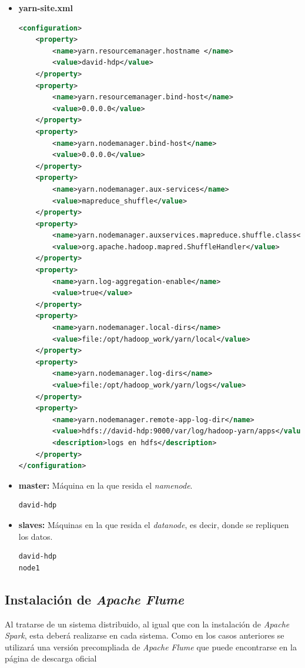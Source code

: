 \begin{itemize}
\item \textbf{ yarn-site.xml}
\begin{lstlisting}[label=yarnsite,language=XML,frame=single,caption=Contenido del ``yarn-site.xml''.]
<configuration>
	<property>
		<name>yarn.resourcemanager.hostname </name>
		<value>david-hdp</value>
	</property>
	<property>
		<name>yarn.resourcemanager.bind-host</name>
		<value>0.0.0.0</value>
	</property>
	<property>
		<name>yarn.nodemanager.bind-host</name>
		<value>0.0.0.0</value>
	</property>
	<property>
		<name>yarn.nodemanager.aux-services</name>
		<value>mapreduce_shuffle</value>
	</property>
	<property>
		<name>yarn.nodemanager.auxservices.mapreduce.shuffle.class</name>
		<value>org.apache.hadoop.mapred.ShuffleHandler</value>
	</property>
	<property>
		<name>yarn.log-aggregation-enable</name>
		<value>true</value>
	</property>
	<property>
		<name>yarn.nodemanager.local-dirs</name>
		<value>file:/opt/hadoop_work/yarn/local</value>
	</property>
	<property>
		<name>yarn.nodemanager.log-dirs</name>
		<value>file:/opt/hadoop_work/yarn/logs</value>
	</property>
	<property>
		<name>yarn.nodemanager.remote-app-log-dir</name>
		<value>hdfs://david-hdp:9000/var/log/hadoop-yarn/apps</value>
		<description>logs en hdfs</description>
	</property>
</configuration>
\end{lstlisting}

\item \textbf{master:} Máquina en la que resida el \textit{namenode}.
\begin{lstlisting}[label=masterHadoop,language=sh,frame=single,caption=Línea a añadir a ``master''.]
david-hdp
\end{lstlisting}

\item \textbf{slaves:} Máquinas en la que resida el \textit{datanode}, es decir, donde se repliquen los datos.
\begin{lstlisting}[label=slavesHadoop,language=sh,frame=single,caption=Líneas a añadir a ``slaves''.]
david-hdp
node1
\end{lstlisting}
\end{itemize}

\clearpage
\subsection{Instalación de \textit{Apache Flume}}
Al tratarse de un sistema distribuido, al igual que con la instalación de \textit{Apache Spark}, esta deberá realizarse en cada sistema. Como en los casos anteriores se utilizará una versión precompliada de \textit{Apache Flume} que puede encontrarse en la página de descarga oficial \cite{descargaFlume}

